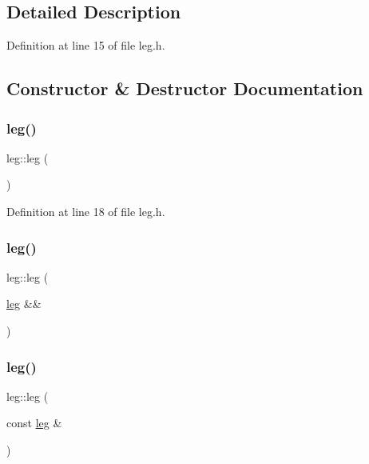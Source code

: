 \subsection{Detailed Description}


Definition at line 15 of file leg.\+h.



\subsection{Constructor \& Destructor Documentation}
\mbox{\label{classleg_a418877dece641560d83d01fa236ec8a4}} 
\subsubsection{\texorpdfstring{leg()}{leg()}\hspace{0.1cm}{\footnotesize\ttfamily [1/3]}}
{\footnotesize\ttfamily leg\+::leg (\begin{DoxyParamCaption}{ }\end{DoxyParamCaption})\hspace{0.3cm}{\ttfamily [inline]}}



Definition at line 18 of file leg.\+h.

\mbox{\label{classleg_a880c3eda57ee576b1c091e09c8679096}} 
\subsubsection{\texorpdfstring{leg()}{leg()}\hspace{0.1cm}{\footnotesize\ttfamily [2/3]}}
{\footnotesize\ttfamily leg\+::leg (\begin{DoxyParamCaption}\item[{\mbox{\hyperlink{classleg}{leg}} \&\&}]{ }\end{DoxyParamCaption})\hspace{0.3cm}{\ttfamily [default]}}

\mbox{\label{classleg_a855f8b6bb7b32343290bddf9b7af2ab1}} 
\subsubsection{\texorpdfstring{leg()}{leg()}\hspace{0.1cm}{\footnotesize\ttfamily [3/3]}}
{\footnotesize\ttfamily leg\+::leg (\begin{DoxyParamCaption}\item[{const \mbox{\hyperlink{classleg}{leg}} \&}]{ }\end{DoxyParamCaption})\hspace{0.3cm}{\ttfamily [default]}}

